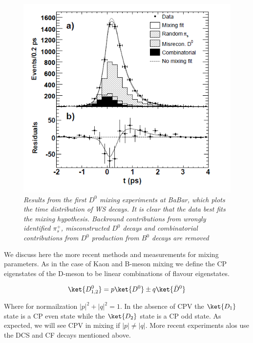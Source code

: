 \begin{figure}[h!]
\begin{center}
\includegraphics[scale=0.4]{figs/BaBar_D0_Mixing_Results.png}
\end{center}
\caption{\textit{Results from the first $D^{0}$ mixing experiments at BaBar, which plots the time distribution of WS decays. It is clear that the data best fits the mixing hypothesis. Backround contributions from wrongly identified $\pi^{+}_{s}$, misconstructed $D^{0}$ decays and combinatorial contributions from $D^{0}$ production from $B^{0}$ decays are removed}}
\label{BaBar_D0_Mixing_Results.png}
\end{figure}

We discuss here the more recent methods and measurements for mixing parameters. As in the case of Kaon and B-meson mixing we define the CP eigenstates of the D-meson to be linear combinations of flavour eigenstates.

\begin{equation*}
\ket{D^{0}_{1,2}} = p \ket{D^{0}} \pm q \ket{\bar{D}^{0}}
\end{equation*}

\noindent Where for normailzation $|p|^{2}+|q|^{2} = 1$. In the absence of CPV the $\ket{D_{1}}$ state is a CP even state while the $\ket{D_{2}}$ state is a CP odd state. As expected, we will see CPV in mixing if $|p| \neq |q|$. More recent experiments alos use the DCS and CF decays mentioned above. 






